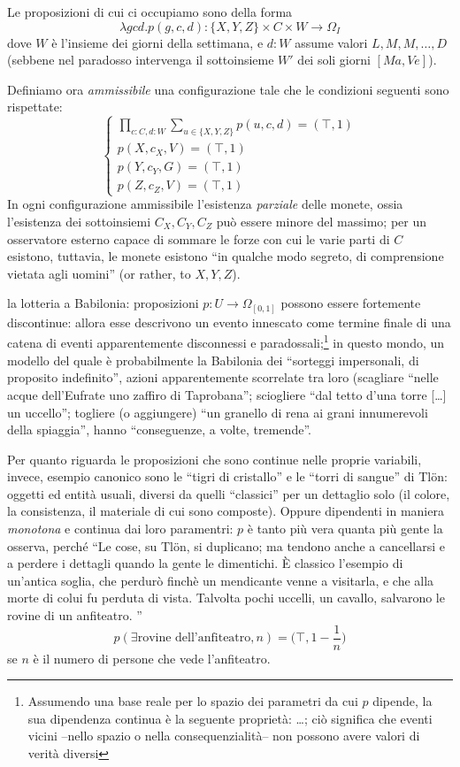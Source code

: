 \begin{example}
  Le proposizioni di cui ci occupiamo sono della forma
  \[\lambda gcd.p(g, c, d) : \{X,Y,Z\}\times C\times W \to \Omega_I\]
  dove $W$ è l'insieme dei giorni della settimana, e $d : W$ assume valori $L,M,M,\dots,D$ (sebbene nel paradosso intervenga il sottoinsieme $W'$ dei soli giorni $[Ma,Ve]$).

  Definiamo ora \emph{ammissibile} una configurazione tale che le condizioni seguenti sono rispettate: 
  \[
  \begin{cases}
    \prod_{c:C, d:W} \sum_{u\in \{X,Y,Z\}} p(u,c,d) = (\top, 1) \\ 
    p(X,c_X,V) = (\top,1)\\
    p(Y,c_Y,G) = (\top,1)\\
    p(Z,c_Z,V) = (\top,1)
  \end{cases}  
  \]
  In ogni configurazione ammissibile l'esistenza \emph{parziale} delle monete, ossia l'esistenza dei sottoinsiemi $C_X,C_Y,C_Z$ può essere minore del massimo; per un osservatore esterno capace di sommare le forze con cui le varie parti di $C$ esistono, tuttavia, le monete esistono ``in qualche modo segreto, di comprensione vietata agli uomini'' (or rather, to $X,Y,Z$).
\end{example}
\begin{example}
  la lotteria a Babilonia: proposizioni $p : U \to \Omega_{[0,1]}$ possono essere fortemente discontinue: allora esse descrivono un evento innescato come termine finale di una catena di eventi apparentemente disconnessi e paradossali;\footnote{Assumendo una base reale per lo spazio dei parametri da cui $p$ dipende, la sua dipendenza continua è la seguente proprietà: \dots; ciò significa che eventi vicini --nello spazio o nella consequenzialità-- non possono avere valori di verità diversi} in questo mondo, un modello del quale è probabilmente la Babilonia dei ``sorteggi impersonali, di proposito indefinito'', azioni apparentemente scorrelate tra loro (scagliare ``nelle acque dell'Eufrate uno zaffiro di Taprobana''; sciogliere ``dal tetto d'una torre [\dots\unkern] un uccello''; togliere (o aggiungere) ``un granello di rena ai grani innumerevoli della spiaggia'', hanno ``conseguenze, a volte, tremende''.
\end{example}
\begin{example}
  Per quanto riguarda le proposizioni che sono continue nelle proprie variabili, invece, esempio canonico sono le ``tigri di cristallo'' e le ``torri di sangue'' di Tl\"{o}n: oggetti ed entità usuali, diversi da quelli ``classici'' per un dettaglio solo (il colore, la consistenza, il materiale di cui sono composte). Oppure dipendenti in maniera \emph{monotona} e continua dai loro paramentri: $p$ è tanto più vera quanta più gente la osserva, perché ``Le cose, su Tlön, si duplicano; ma tendono anche a cancellarsi e a  perdere i dettagli quando la gente le dimentichi. È classico l'esempio di  un'antica soglia, che perdurò finchè un mendicante venne a visitarla, e che alla  morte di colui fu perduta di vista. Talvolta pochi uccelli, un cavallo, salvarono le  rovine di un anfiteatro. ''
        \[\textstyle p(\exists\text{rovine dell'anfiteatro}, n) = \big(\top, 1-\frac{1}{n}\big)\]
        se $n$ è il numero di persone che vede l'anfiteatro.
\end{example}
